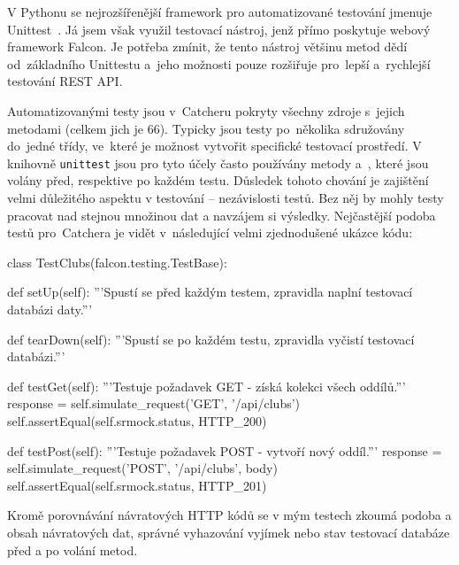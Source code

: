 V Pythonu se nejrozšířenější framework pro automatizované testování jmenuje Unittest~\cite{python_unittest}. Já jsem však využil testovací nástroj, jenž přímo
poskytuje webový framework Falcon. Je potřeba zmínit, že tento nástroj většinu metod dědí od~základního Unittestu a~jeho možnosti pouze
rozšiřuje pro~lepší a~rychlejší testování REST API.

Automatizovanými testy jsou v~Catcheru pokryty všechny zdroje s~jejich metodami (celkem jich je 66). Typicky jsou testy po~několika sdružovány do~jedné třídy,
ve~které je možnost vytvořit specifické testovací prostředí. V knihovně \texttt{unittest} jsou pro tyto účely často používány metody  a~,
které jsou volány před, respektive po každém testu. Důsledek tohoto chování je zajištění velmi důležitého aspektu v testování -- nezávislosti testů.
Bez něj by mohly testy pracovat nad stejnou množinou dat a navzájem si  výsledky.
Nejčastější podoba testů pro~Catchera je vidět v~následující velmi zjednodušené ukázce kódu: 

\begin{python}
class TestClubs(falcon.testing.TestBase):

    def setUp(self):
      '''Spustí se před každým testem,
      zpravidla naplní testovací databázi daty.'''

    def tearDown(self):
      '''Spustí se po každém testu,
      zpravidla vyčistí testovací databázi.'''

    def testGet(self):
      '''Testuje požadavek GET - získá kolekci všech oddílů.'''     
      response = self.simulate_request('GET', '/api/clubs')
      self.assertEqual(self.srmock.status, HTTP_200)

    def testPost(self):
      '''Testuje požadavek POST - vytvoří nový oddíl.'''
      response = self.simulate_request('POST', '/api/clubs', body)
      self.assertEqual(self.srmock.status, HTTP_201)
\end{python}

Kromě porovnávání návratových HTTP kódů se v mým testech zkoumá podoba a obsah návratových dat, správné vyhazování vyjímek
nebo stav testovací databáze před a po volání metod.